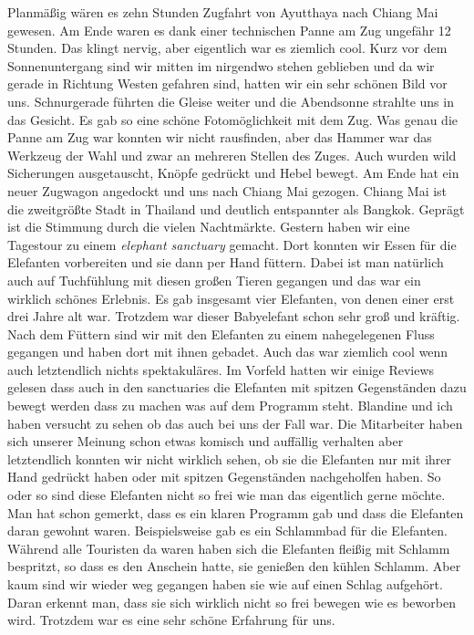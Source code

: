 \documentclass[11pt]{book}
\begin{document}
Planmäßig wären es zehn Stunden Zugfahrt von Ayutthaya nach Chiang Mai gewesen. Am Ende waren es dank einer technischen Panne am 
Zug ungefähr 12 Stunden. Das klingt nervig, aber eigentlich war es ziemlich cool. Kurz vor dem Sonnenuntergang sind wir mitten im 
nirgendwo stehen geblieben und da wir gerade in Richtung Westen gefahren sind, hatten wir ein sehr schönen Bild vor uns. Schnurgerade
führten die Gleise weiter und die Abendsonne strahlte uns in das Gesicht. Es gab so eine schöne Fotomöglichkeit mit dem Zug. Was 
genau die Panne am Zug war konnten wir nicht rausfinden, aber das Hammer war das Werkzeug der Wahl und zwar an mehreren Stellen
des Zuges. Auch wurden wild Sicherungen ausgetauscht, Knöpfe gedrückt und Hebel bewegt. Am Ende hat ein neuer Zugwagon angedockt 
und uns nach Chiang Mai gezogen. 
Chiang Mai ist die zweitgrößte Stadt in Thailand und deutlich entspannter als Bangkok. Geprägt ist die Stimmung durch die vielen 
Nachtmärkte. Gestern haben wir eine Tagestour zu einem \emph{elephant sanctuary} gemacht. Dort konnten wir Essen für die Elefanten 
vorbereiten und sie dann per Hand füttern. Dabei ist man natürlich auch auf Tuchfühlung mit diesen großen Tieren gegangen und das 
war ein wirklich schönes Erlebnis. Es gab insgesamt vier Elefanten, von denen einer erst drei Jahre alt war. Trotzdem war dieser 
Babyelefant schon sehr groß und kräftig. Nach dem Füttern sind wir mit den Elefanten zu einem nahegelegenen Fluss gegangen und haben 
dort mit ihnen gebadet. Auch das war ziemlich cool wenn auch letztendlich nichts spektakuläres. Im Vorfeld hatten wir einige Reviews 
gelesen dass auch in den sanctuaries die Elefanten mit spitzen Gegenständen dazu bewegt werden dass zu machen was auf dem Programm 
steht. Blandine und ich haben versucht zu sehen ob das auch bei uns der Fall war. Die Mitarbeiter haben sich unserer Meinung schon 
etwas komisch und auffällig verhalten aber letztendlich konnten wir nicht wirklich sehen, ob sie die Elefanten nur mit ihrer Hand 
gedrückt haben oder mit spitzen Gegenständen nachgeholfen haben. So oder so sind diese Elefanten nicht so frei wie man das eigentlich 
gerne möchte. Man hat schon gemerkt, dass es ein klaren Programm gab und dass die Elefanten daran gewohnt waren. Beispielsweise 
gab es ein Schlammbad für die Elefanten. Während alle Touristen da waren haben sich die Elefanten fleißig mit Schlamm bespritzt, so dass 
es den Anschein hatte, sie genießen den kühlen Schlamm. Aber kaum sind wir wieder weg gegangen haben sie wie auf einen Schlag 
aufgehört. Daran erkennt man, dass sie sich wirklich nicht so frei bewegen wie es beworben wird. Trotzdem war es eine sehr schöne 
Erfahrung für uns. 
\end{document}
